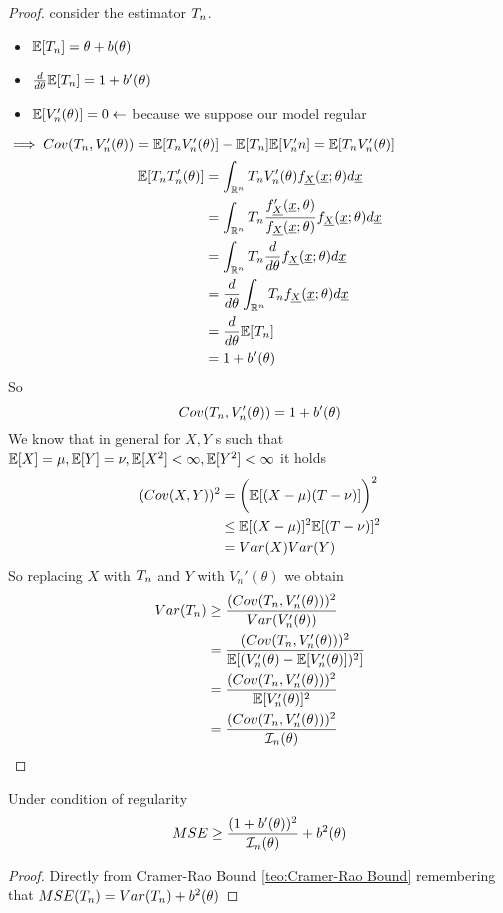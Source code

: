 \begin{proof}
	consider the estimator $T_{n}$.
	\begin{itemize}
		\item $\mathbb{E}[T_{n}]=\theta +b(\theta)$
		\item $\frac{d}{d\theta} \mathbb{E}[T_{n}]=1+b'(\theta)$
		\item $\mathbb{E}[V_n'(\theta)]=0 \leftarrow$ because we suppose our model regular
	\end{itemize}
$\implies Cov(T_{n}, V_n'(\theta))=\mathbb{E}[T_{n} V_n'(\theta)] - \mathbb{E}[T_{n}]\mathbb{E}[V_n'n]=\mathbb{E}[T_{n} V_n'(\theta)]$ 
\[
\begin{split}
\mathbb{E}[T_{n} T_n'(\theta)]&
=\int_{\mathbb{R}^n}T_{n} V_n'(\theta) f_{\underline X}(\underline{x};\theta) d\underline x\\
&=\int_{\mathbb{R}^n}T_{n} \frac{f_{\underline X}'(\underline x,\theta)}{f_{\underline X}(\underline{x};\theta)}f_{\underline X}(\underline{x};\theta) d\underline x\\
&=\int_{\mathbb{R}^n}T_{n} \frac{d}{d\theta} f_{\underline X}(\underline{x};\theta) d\underline x\\
&=\frac{d}{d\theta} \int_{\mathbb{R}^n}T_{n} f_{\underline X}(\underline{x};\theta) d\underline x\\
&=\frac{d}{d\theta} \mathbb{E}[T_{n}]\\
&=1+b'(\theta)
\end{split}
\]
So
\[
Cov(T_{n},V_n'(\theta))=1+b'(\theta)
\]
We know that in general for $X,Y$ \rv s such that $\mathbb{E}[X]=\mu, \mathbb{E}[Y]=\nu, \mathbb{E}[X^2]<\infty, \mathbb{E}[Y^2]<\infty$ it holds
\[
\begin{split}
(Cov(X,Y))^2&=\bigg( \mathbb{E}[(X-\mu)(T-\nu)] \bigg)^2\\
&\leq  \mathbb{E}[(X-\mu)]^2 \mathbb{E}[(T-\nu)]^2\\
&= Var(X)Var(Y)
\end{split}
\]
So replacing $X$ with $T_{n}$ and $Y$ with $V_n'(\theta)$ we  obtain
\[
\begin{split}
Var(T_{n})&\geq \frac{(Cov(T_{n},V_n'(\theta)))^2}{Var(V_n'(\theta))}\\
&=\frac{(Cov(T_{n},V_n'(\theta)))^2}{\mathbb{E}[(V_n'(\theta)-\mathbb{E}[V_n'(\theta)])^2]}\\
&=\frac{(Cov(T_{n},V_n'(\theta)))^2}{\mathbb{E}[V_n'(\theta)]^2}\\
&=\frac{(Cov(T_{n},V_n'(\theta)))^2}{\mathcal{I}_n(\theta)}
\end{split}
\]
\end{proof}
\begin{corol}
	Under condition of regularity
	\[MSE \geq \frac{(1+b'(\theta))^2}{\mathcal{I}_n(\theta)} +b^2(\theta) \]
\end{corol}
\begin{proof}
	Directly from Cramer-Rao Bound \ref{teo:Cramer-Rao Bound} remembering that $MSE(T_{n})=Var(T_{n})+b^2(\theta)$
\end{proof}

